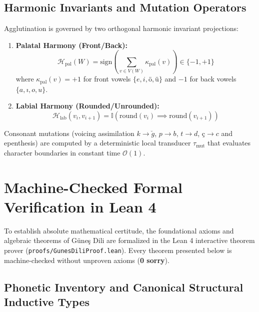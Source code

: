 \documentclass[11pt,a4paper]{article}
\begin{document}
\subsection{Harmonic Invariants and Mutation Operators}

Agglutination is governed by two orthogonal harmonic invariant projections:
\begin{enumerate}
    \item \textbf{Palatal Harmony (Front/Back):}
    \begin{equation}
    \mathcal{H}_{\text{pal}}(W) = \text{sign}\left( \sum_{v \in V(W)} \kappa_{\text{pal}}(v) \right) \in \{-1, +1\}
    \end{equation}
    where $\kappa_{\text{pal}}(v) = +1$ for front vowels $\{e, i, ö, ü\}$ and $-1$ for back vowels $\{a, ı, o, u\}$.
    \item \textbf{Labial Harmony (Rounded/Unrounded):}
    \begin{equation}
    \mathcal{H}_{\text{lab}}(v_i, v_{i+1}) = \mathbb{I}\left( \text{round}(v_i) \implies \text{round}(v_{i+1}) \right)
    \end{equation}
\end{enumerate}

Consonant mutations (voicing assimilation $k \to \breve{g}$, $p \to b$, $t \to d$, $ç \to c$ and epenthesis) are computed by a deterministic local transducer $\tau_{\text{mut}}$ that evaluates character boundaries in constant time $\mathcal{O}(1)$.

\section{Machine-Checked Formal Verification in Lean 4}

To establish absolute mathematical certitude, the foundational axioms and algebraic theorems of Güneş Dili are formalized in the Lean 4 interactive theorem prover (\texttt{proofs/GunesDiliProof.lean}). Every theorem presented below is machine-checked without unproven axioms (\textbf{0 sorry}).

\subsection{Phonetic Inventory and Canonical Structural Inductive Types}
\end{document}
